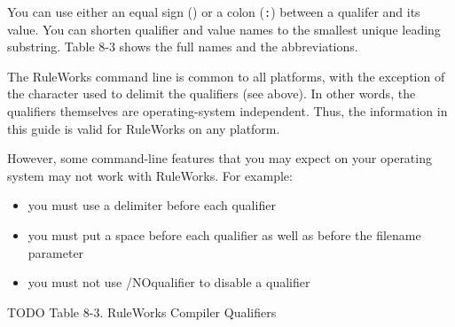 You can use either an equal sign (\co{=}) or a colon (\verb|:|)
between a qualifer and its value. You can shorten qualifier and value
names to the smallest unique leading substring. Table 8-3 shows the
full names and the abbreviations.

\begin{note}
  The RuleWorks command line is common to all platforms, with the
  exception of the character used to delimit the qualifiers (see
  above). In other words, the qualifiers themselves are
  operating-system independent.  Thus, the information in this guide
  is valid for RuleWorks on any platform.
\end{note}

However, some command-line features that you may expect on your
operating system may not work with RuleWorks.  For example:

\begin{itemize}
\item you must use a delimiter before each qualifier
\item you must put a space before each qualifier as well as before the
  filename parameter
\item you must not use /NOqualifier to disable a qualifier
\end{itemize}
  

TODO
Table 8-3. RuleWorks Compiler Qualifiers

